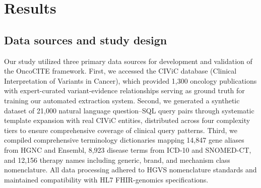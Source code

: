 % 
%
%

\section{Results}\label{sec2}

\subsection{Data sources and study design}\label{subsec1}

Our study utilized three primary data sources for development and validation of the OncoCITE framework. First, we accessed the CIViC database (Clinical Interpretation of Variants in Cancer), which provided 1,300 oncology publications with expert-curated variant-evidence relationships serving as ground truth for training our automated extraction system. Second, we generated a synthetic dataset of 21,000 natural language question--SQL query pairs through systematic template expansion with real CIViC entities, distributed across four complexity tiers to ensure comprehensive coverage of clinical query patterns. Third, we compiled comprehensive terminology dictionaries mapping 14,847 gene aliases from HGNC and Ensembl, 8,923 disease terms from ICD-10 and SNOMED-CT, and 12,156 therapy names including generic, brand, and mechanism class nomenclature. All data processing adhered to HGVS nomenclature standards and maintained compatibility with HL7 FHIR-genomics specifications.

%
%
%
%
%
%

%
%
